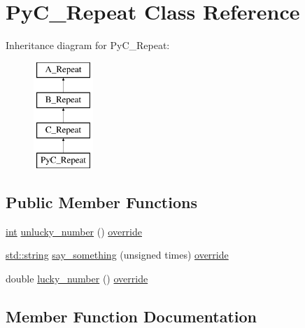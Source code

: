 \hypertarget{class_py_c___repeat}{}\section{Py\+C\+\_\+\+Repeat Class Reference}
\label{class_py_c___repeat}
Inheritance diagram for Py\+C\+\_\+\+Repeat\+:\begin{figure}[H]
\begin{center}
\leavevmode
\includegraphics[height=4.000000cm]{class_py_c___repeat}
\end{center}
\end{figure}
\subsection*{Public Member Functions}
\begin{DoxyCompactItemize}
\item 
\mbox{\hyperlink{warnings_8h_a74f207b5aa4ba51c3a2ad59b219a423b}{int}} \mbox{\hyperlink{class_py_c___repeat_a3d8a581eb064d1900dce749193960a02}{unlucky\+\_\+number}} () \mbox{\hyperlink{dictobject_8h_a055cf4fd16bde9bce026127362cee1a3}{override}}
\item 
\mbox{\hyperlink{_s_d_l__opengl__glext_8h_ab4ccfaa8ab0e1afaae94dc96ef52dde1}{std\+::string}} \mbox{\hyperlink{class_py_c___repeat_acb250c7797db787192db90f6ce3f7686}{say\+\_\+something}} (unsigned times) \mbox{\hyperlink{dictobject_8h_a055cf4fd16bde9bce026127362cee1a3}{override}}
\item 
double \mbox{\hyperlink{class_py_c___repeat_a4661bb26f2bbdd4d51aed48dcb6b3254}{lucky\+\_\+number}} () \mbox{\hyperlink{dictobject_8h_a055cf4fd16bde9bce026127362cee1a3}{override}}
\end{DoxyCompactItemize}


\subsection{Member Function Documentation}
\mbox{\label{class_py_c___repeat_a4661bb26f2bbdd4d51aed48dcb6b3254}} 
